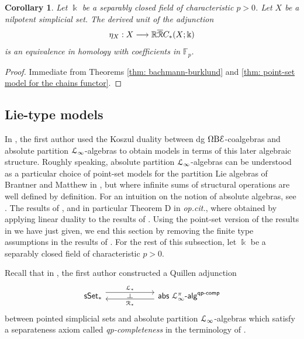 \documentclass{proc-l}
\renewcommand{\mathcal}{\EuScript}
\theoremstyle{plain}
\newtheorem{corollary}[{theorem}]{Corollary}
\theoremstyle{definition}
\theoremstyle{remark}
\newcommand{\kk}{\Bbbk}
\begin{document}
\begin{corollary}%
\label{Corollary:5.5}\label{cor: derived unit is an Fp equivalence}
Let $\kk$ be a separably closed field of characteristic $p >0$. Let $X$ be a nilpotent simplicial set. The derived unit of the adjunction
\[
\eta_X: X \longrightarrow \mathbb{R}\overline{\mathcal{R}}C_*(X;\kk)
\]
is an equivalence in homology with coefficients in $\mathbb{F}_p$.
\end{corollary}

\begin{proof}
Immediate from Theorems \ref{thm: bachmann-burklund} and \ref{thm: point-set model for the chains functor}.
\end{proof}

\subsection{Lie-type models}%
\label{Section:5.3}
In \cite{lucio2024higherlietheorypositive}, the first author used the Koszul duality between dg $\Omega\mathrm{B} \mathcal{E}$-coalgebras and absolute partition $\mathcal{L}_\infty$-algebras to obtain models in terms of this later algebraic structure. Roughly speaking, absolute partition $\mathcal{L}_\infty$-algebras can be understood as a particular choice of point-set models for the partition Lie algebras of Brantner and Matthew in \cite{brantnermathew}, but where infinite sums of structural operations are well defined by definition. For an intuition on the notion of absolute algebras, see \cite{absolutealgebras}. The results of \cite{lucio2024higherlietheorypositive}, and in particular Theorem D in \textit{op.cit.}, where obtained by applying linear duality to the results of \cite{Mandell01}. Using the point-set version of the results in \cite{bachmann2024} we have just given, we end this section by removing the finite type assumptions in the results of \cite{lucio2024higherlietheorypositive}. For the rest of this subsection, let $\kk$ be a separably closed field of characteristic $p >0$.

Recall that in \cite{lucio2024higherlietheorypositive}, the first author constructed a Quillen adjunction
\[
\begin{tikzcd}[column sep=5pc,row sep=3pc]
\mathsf{sSet}_* \arrow[r, shift left=1.1ex, "\mathcal{L}_*"{name=A}]
&\mathsf{abs}~\mathcal{L}_\infty^\pi\text{-}\mathsf{alg}^{\mathsf{qp}\text{-}\mathsf{comp}} \arrow[l, shift left=.75ex, "\mathcal{R}_*"{name=B}]
\arrow[phantom, from=A, to=B, , "\dashv" rotate=-90]
\end{tikzcd}
\]
between pointed simplicial sets and absolute partition $\mathcal{L}_\infty$-algebras which satisfy a separateness axiom called \textit{qp-completeness} in the terminology of \cite{premierpapier}.
\end{document}
